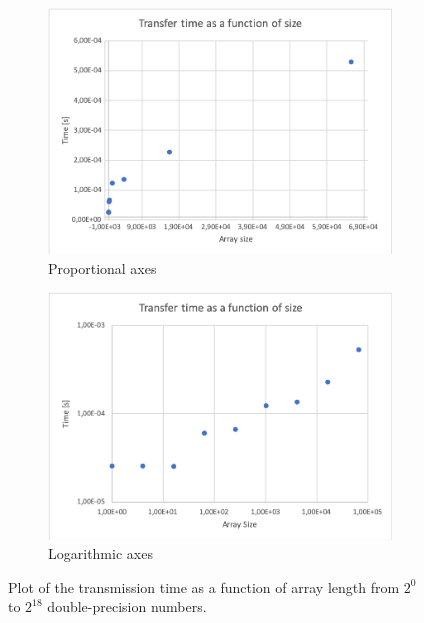 \documentclass{article}
\begin{document}
\begin{figure}[h]
\centering
\begin{subfigure}{.49\textwidth}
  \centering
  \includegraphics[width=1\linewidth]{figures/normplot.png}
  \caption{Proportional axes}
  \label{fig:normplot}
\end{subfigure}%
\begin{subfigure}{.49\textwidth}
  \centering
  \includegraphics[width=1\linewidth]{figures/logplot.png}
  \caption{Logarithmic axes}
  \label{fig:logplot}
\end{subfigure}
\caption{Plot of the transmission time as a function of array length from $2^0$ to $2^{18}$ double-precision numbers.}
\label{fig:bandwidth}
\end{figure}
\end{document}
